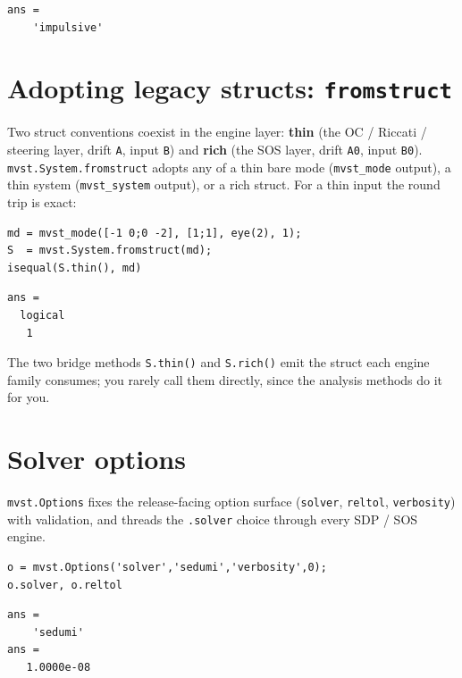 \documentclass[11pt,oneside]{report}
\newcommand{\code}[1]{\texttt{#1}}
\begin{document}
\begin{lstlisting}[style=outputstyle]
ans =
    'impulsive'
\end{lstlisting}

\hypertarget{adopting-legacy-structs-fromstruct}{%
\section{\texorpdfstring{Adopting legacy structs: \code{fromstruct}}{Adopting legacy structs: fromstruct}}\label{adopting-legacy-structs-fromstruct}}

Two struct conventions coexist in the engine layer: \textbf{thin} (the OC / Riccati
/ steering layer, drift \code{A}, input \code{B}) and \textbf{rich} (the SOS layer, drift
\code{A0}, input \code{B0}). \code{mvst.System.fromstruct} adopts any of a thin bare mode
(\code{mvst\_mode} output), a thin system (\code{mvst\_system} output), or a rich struct.
For a thin input the round trip is exact:

\begin{lstlisting}[style=matlabstyle]
md = mvst_mode([-1 0;0 -2], [1;1], eye(2), 1);
S  = mvst.System.fromstruct(md);
isequal(S.thin(), md)
\end{lstlisting}

\begin{lstlisting}[style=outputstyle]
ans =
  logical
   1
\end{lstlisting}

The two bridge methods \code{S.thin()} and \code{S.rich()} emit the struct each engine
family consumes; you rarely call them directly, since the analysis methods do
it for you.

\hypertarget{solver-options}{%
\section{Solver options}\label{solver-options}}

\code{mvst.Options} fixes the release-facing option surface (\code{solver}, \code{reltol},
\code{verbosity}) with validation, and threads the \code{.solver} choice through every
SDP / SOS engine.

\begin{lstlisting}[style=matlabstyle]
o = mvst.Options('solver','sedumi','verbosity',0);
o.solver, o.reltol
\end{lstlisting}

\begin{lstlisting}[style=outputstyle]
ans =
    'sedumi'
ans =
   1.0000e-08
\end{lstlisting}
\end{document}
